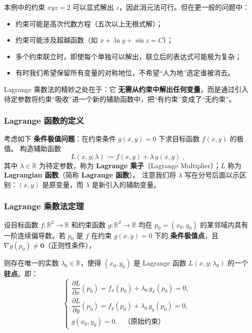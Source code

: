 \documentclass[lang=cn,11pt]{elegantbook}
\begin{document}
\begin{note}[消元法的局限]
本例中的约束 $xyz=2$ 可以显式解出 $z$，因此消元法可行。但在更一般的问题中：
\begin{itemize}
  \item 约束可能是高次代数方程（五次以上无根式解）；
  \item 约束可能涉及超越函数（如 $x+\ln y+\sin z=C$）；
  \item 多个约束联立时，即使每个单独可以解出，联立后的表达式可能极为复杂；
  \item 有时我们希望保留所有变量的对称地位，不希望“人为地”选定谁被消去。
\end{itemize}
Lagrange 乘数法的精妙之处在于：它 \textbf{无需从约束中解出任何变量}，而是通过引入待定参数将约束“吸收”进一个新的辅助函数中，把“有约束”变成了“无约束”。
\end{note}

\subsubsection*{Lagrange 函数的定义}

\begin{definition} \label{def:lagrangian}
考虑如下 \textbf{条件极值问题}：在约束条件 $g(x,y)=0$ 下求目标函数 $f(x,y)$ 的极值。
构造辅助函数
\[
\boxed{\;
L(x,y;\lambda):=f(x,y)+\lambda\,g(x,y)\;},
\]
其中 $\lambda\in\mathbb R$ 为待定参数，称为 \textbf{Lagrange 乘子}（Lagrange Multiplier）；$L$ 称为 \textbf{Lagrangian 函数}（简称 \textbf{Lagrange 函数}）。
注意我们将 $\lambda$ 写在分号后面以示区别：$(x,y)$ 是原变量，而 $\lambda$ 是新引入的辅助变量。
\end{definition}

\subsubsection*{Lagrange 乘数法定理}

\begin{theorem} \label{thm:lagrange-single}
设目标函数 $f:\mathbb R^2\to\mathbb R$ 和约束函数 $g:\mathbb R^2\to\mathbb R$ 均在 $p_0=(x_0,y_0)$ 的某邻域内具有一阶连续偏导数。若 $p_0$ 是 $f$ 在约束 $g(x,y)=0$ 下的 \textbf{条件极值点}，且 $\nabla g(p_0) \neq \boldsymbol{0}$（正则性条件），

则存在唯一的实数 $\lambda_0\in\mathbb R$，使得 $(x_0,y_0)$ 是 Lagrange 函数 $L(x,y;\lambda_0)$ 的一个 \textbf{驻点}。即：
\[
\boxed{
\begin{cases}
\dfrac{\partial L}{\partial x}(p_0) =f_x(p_0)+\lambda_0\,g_x(p_0)=0,\\[10pt]
\dfrac{\partial L}{\partial y}(p_0) =f_y(p_0)+\lambda_0\,g_y(p_0)=0,\\[10pt]
g(x_0,y_0)=0.\quad\text{（原始约束）}
\end{cases}}
\]
\end{theorem}
\end{document}

